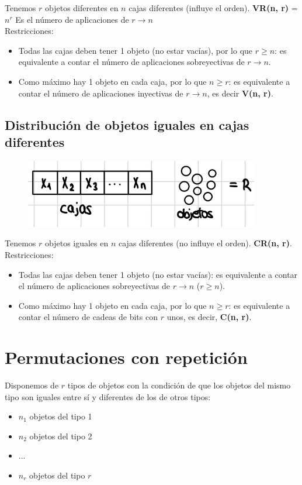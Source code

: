 \documentclass{article}
\begin{document}
Tenemos $r$ objetos diferentes en $n$ cajas diferentes (influye el orden). \textbf{VR(n, r)} = $n^r$ Es el número de aplicaciones de $r \xrightarrow{} n$ \\
Restricciones:
\begin{itemize}
    \item Todas las cajas deben tener 1 objeto (no estar vacías), por lo que $r \geq n$: es equivalente a contar el número de aplicaciones sobreyectivas de $r \xrightarrow{} n$.
    
    \item Como máximo hay 1 objeto en cada caja, por lo que $n \geq r$: es equivalente a contar el número de aplicaciones inyectivas de $r \xrightarrow{} n$, es decir \textbf{V(n, r)}.
\end{itemize}

\newpage

\subsection{Distribución de objetos iguales en cajas diferentes}

\begin{figure}
    \centering
    \includegraphics[width=\linewidth]{img-t2/img_603_36.png}
\end{figure}

Tenemos $r$ objetos iguales en $n$ cajas diferentes (no influye el orden). \textbf{CR(n, r)}. \\
Restricciones:
\begin{itemize}
    \item Todas las cajas deben tener 1 objeto (no estar vacías): es equivalente a contar el número de aplicaciones sobreyectivas de $r \xrightarrow{} n$ ($r \geq n$).

    \item Como máximo hay 1 objeto en cada caja, por lo que $n \geq r$: es equivalente a contar el número de cadeas de bits con $r$ unos, es decir, \textbf{C(n, r)}.
\end{itemize}

\section{Permutaciones con repetición}
Disponemos de $r$ tipos de objetos con la condición de que los objetos del mismo tipo son iguales entre sí y diferentes de los de otros tipos:
\begin{itemize}
    \item $n_1$ objetos del tipo 1 
    \item $n_2$ objetos del tipo 2
    \item ...
    \item $n_r$ objetos del tipo $r$
\end{itemize}
\end{document}
